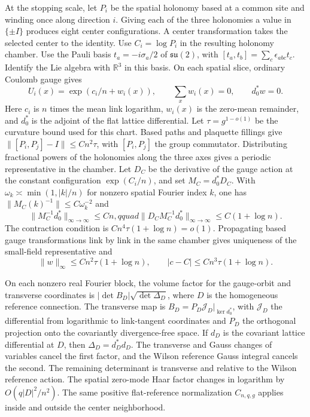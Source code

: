 \documentclass[11pt,a4paper]{article}
\numberwithin{equation}{section}
\begin{document}
At the stopping scale, let \(P_i\) be the spatial holonomy based at a common site and winding once along direction \(i\). Giving each of the three holonomies a value in \(\{\pm I\}\) produces eight center configurations. A center transformation takes the selected center to the identity. Use \(C_i=\log P_i\) in the resulting holonomy chamber. Use the Pauli basis \(t_a=-i\sigma_a/2\) of \(\mathfrak{su}(2)\), with \([t_a,t_b]=\sum_c\epsilon_{abc}t_c\). Identify the Lie algebra with \(\mathbb R^3\) in this basis. On each spatial slice, ordinary Coulomb gauge gives
\[
 U_i(x)=\exp(c_i/n+w_i(x)),\qquad \sum_xw_i(x)=0,\qquad d_0^*w=0 .
\]
Here \(c_i\) is \(n\) times the mean link logarithm, \(w_i(x)\) is the zero-mean remainder, and \(d_0^*\) is the adjoint of the flat lattice differential. Let \(\tau=g^{1-o(1)}\) be the curvature bound used for this chart. Based paths and plaquette fillings give \(\|[P_i,P_j]-I\|\le Cn^2\tau\), with \([P_i,P_j]\) the group commutator. Distributing fractional powers of the holonomies along the three axes gives a periodic representative in the chamber. Let \(D_C\) be the derivative of the gauge action at the constant configuration \(\exp(C_i/n)\), and set \(M_C=d_0^*D_C\). With \(\omega_k\asymp\min(1,|k|/n)\) for nonzero spatial Fourier index \(k\), one has \(\|M_C(k)^{-1}\|\le C\omega_k^{-2}\) and
\[
 \|M_C^{-1}d_0^*\|_{\infty\to\infty}\le Cn,qquad
 \|D_C M_C^{-1}d_0^*\|_{\infty\to\infty}\le C(1+\log n).
\]
The contraction condition is \(Cn^4\tau(1+\log n)=o(1)\). Propagating based gauge transformations link by link in the same chamber gives uniqueness of the small-field representative and
\[
 \|w\|_\infty\le Cn^2\tau(1+\log n),\qquad
 |c-C|\le Cn^3\tau(1+\log n).
\]

On each nonzero real Fourier block, the volume factor for the gauge-orbit and transverse coordinates is \(|\det B_D|\sqrt{\det\Delta_D}\), where \(D\) is the homogeneous reference connection. The transverse map is \(B_D=P_D\mathcal J_D|_{\ker d_0^*}\), with \(\mathcal J_D\) the differential from logarithmic to link-tangent coordinates and \(P_D\) the orthogonal projection onto the covariantly divergence-free space. If \(d_D\) is the covariant lattice differential at \(D\), then \(\Delta_D=d_D^*d_D\). The transverse and Gauss changes of variables cancel the first factor, and the Wilson reference Gauss integral cancels the second. The remaining determinant is transverse and relative to the Wilson reference action. The spatial zero-mode Haar factor changes in logarithm by \(O(q|D|^2/n^2)\). The same positive flat-reference normalization \(C_{n,q,g}\) applies inside and outside the center neighborhood.
\end{document}
